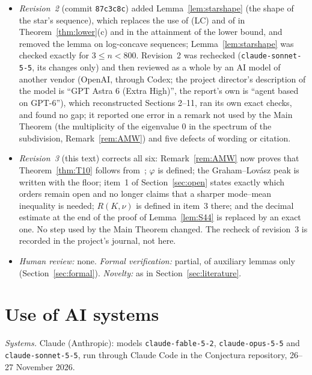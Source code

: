 \documentclass[11pt]{amsart}
\theoremstyle{definition}
\theoremstyle{remark}
\begin{document}
\begin{itemize}
proofs not used by the Main Theorem and several defects of wording and
bookkeeping, corrected in revision~2).
\item \emph{Revision~2} (commit \texttt{87c3c8c}) added
Lemma~\ref{lem:starshape} (the shape of the star's sequence), which replaces
the use of (LC) and of \cite[Theorem~1]{Col89} in
Theorem~\ref{thm:lower}(c) and in the attainment of the lower bound, and
removed the lemma on log-concave sequences; Lemma~\ref{lem:starshape} was
checked exactly for $3\le n<800$. Revision~2 was rechecked
(\nolinkurl{claude-sonnet-5-5}, its changes only) and then reviewed as a
whole by an AI model of another vendor (OpenAI, through Codex; the project
director's description of the model is ``GPT Astra 6 (Extra High)'', the
report's own is ``agent based on GPT-6''), which reconstructed Sections
2--11, ran its own exact checks, and found no gap; it reported one error in a
remark not used by the Main Theorem (the multiplicity of the eigenvalue $0$
in the spectrum of the subdivision, Remark~\ref{rem:AMW}) and five defects
of wording or citation.
\item \emph{Revision~3} (this text) corrects all six: Remark~\ref{rem:AMW}
now proves that Theorem~\ref{thm:T10} follows from~\cite{AMW}; $\varphi$ is
defined; the Graham--Lov\'asz peak is written with the floor; item~1 of
Section~\ref{sec:open} states exactly which orders remain open and no longer
claims that a sharper mode--mean inequality is needed; $R(K,\nu)$ is defined
in item~3 there; and the decimal estimate at the end of the proof of
Lemma~\ref{lem:S44} is replaced by an exact one. No step used by the Main
Theorem changed. The recheck of revision~3 is recorded in the project's
journal, not here.
\item \emph{Human review:} none. \emph{Formal verification:} partial, of
auxiliary lemmas only (Section~\ref{sec:formal}). \emph{Novelty:} as in
Section~\ref{sec:literature}.
\end{itemize}

\section*{Use of AI systems}

\emph{Systems.} Claude (Anthropic): models \nolinkurl{claude-fable-5-2},
\nolinkurl{claude-opus-5-5} and \nolinkurl{claude-sonnet-5-5}, run through
Claude Code in the Conjectura repository, 26--27 November 2026.
\end{document}

